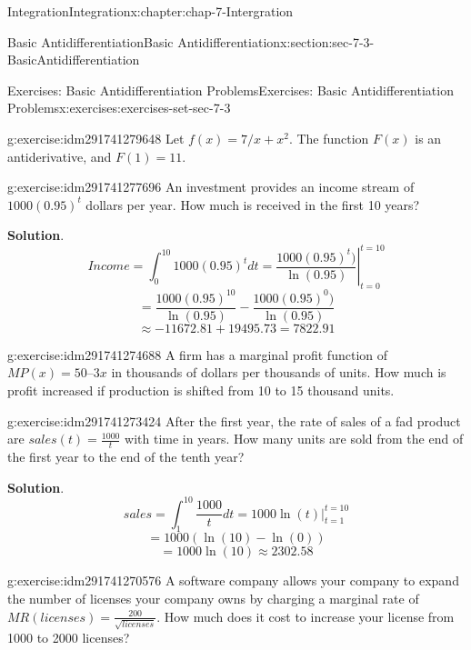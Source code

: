 \documentclass[oneside,10pt,]{book}
\numberwithin{equation}{section}
\begin{document}
\begin{chapterptx}{Integration}{}{Integration}{}{}{x:chapter:chap-7-Intergration}
\begin{sectionptx}{Basic Antidifferentiation}{}{Basic Antidifferentiation}{}{}{x:section:sec-7-3-BasicAntidifferentiation}
\begin{exercises-subsection}{Exercises: Basic Antidifferentiation Problems}{}{Exercises: Basic Antidifferentiation Problems}{}{}{x:exercises:exercises-set-sec-7-3}
\begin{divisionexercise}{16}{}{}{g:exercise:idm291741279648}
Let \(f(x)=7/x+x^2\).  The function \(F(x)\)  is an antiderivative, and \(F(1)=11\).%
\end{divisionexercise}%
\begin{divisionexercise}{17}{}{}{g:exercise:idm291741277696}%
An investment provides an income stream of \(1000 (0.95)^t\) dollars per year.  How much is received in the first 10 years?%
\par\smallskip%
\noindent\textbf{Solution}.\hypertarget{g:solution:idm291741276528}{}\quad{}%
\begin{equation*}
Income=\int_0^{10}1000(0.95)^t  dt
=\left.\frac{1000(0.95)^t)}{\ln(0.95)} \right|_{t=0}^{t=10}
\end{equation*}
%
\begin{equation*}
=\frac{1000(0.95)^{10}}{\ln(0.95)} -\frac{1000(0.95)^0)}{\ln(0.95)} 
\end{equation*}
%
\begin{equation*}
\approx -11672.81+19495.73=7822.91
\end{equation*}
\end{divisionexercise}%
\begin{divisionexercise}{18}{}{}{g:exercise:idm291741274688}%
A firm has a marginal profit function of \(MP(x) = 50 – 3 x\) in thousands of dollars per thousands of units.  How much is profit increased if production is shifted from 10 to 15 thousand units.%
\end{divisionexercise}%
\begin{divisionexercise}{19}{}{}{g:exercise:idm291741273424}%
After the first year, the rate of sales of a fad product are \(sales(t) = \frac{1000}{t}\) with time in years.  How many units are sold from the end of the first year to the end of the tenth year?%
\par\smallskip%
\noindent\textbf{Solution}.\hypertarget{g:solution:idm291741272320}{}\quad{}%
\begin{equation*}
sales=\int_1^{10}\frac{1000}{t} dt=1000 \ln(t) |_{t=1}^{t=10}
\end{equation*}
%
\begin{equation*}
=1000(\ln(10)-\ln(0) )
\end{equation*}
%
\begin{equation*}
=1000\ln(10)\approx 2302.58
\end{equation*}
\end{divisionexercise}%
\begin{divisionexercise}{20}{}{}{g:exercise:idm291741270576}%
A software company allows your company to expand the number of licenses your company owns by charging a marginal rate of \(MR(licenses)=\frac{200}{\sqrt{licenses}}\).  How much does it cost to increase your license from 1000 to 2000 licenses?%

\end{divisionexercise}
\end{exercises-subsection}
\end{sectionptx}
\end{chapterptx}
\end{document}
